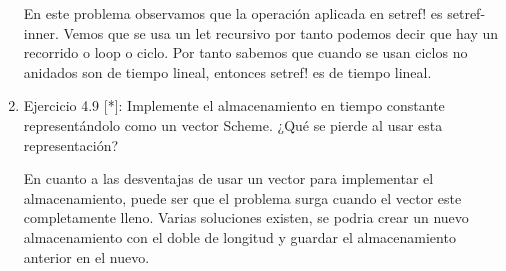 \documentclass[12pt]{exam}
\begin{document}
\begin{enumerate}
\begin{verbatim}
\end{verbatim}
\normalsize

\justifying
En este problema observamos que la operación aplicada en setref! es setref-inner. Vemos que se usa un let recursivo por tanto podemos decir que hay un recorrido o loop o ciclo. Por tanto sabemos que cuando se usan ciclos no anidados son de tiempo lineal, entonces setref! es de tiempo lineal.

\item Ejercicio 4.9 [*]: Implemente el almacenamiento en tiempo constante representándolo como un vector Scheme. ¿Qué se pierde al usar esta representación?

\justifying
En cuanto a las desventajas de usar un vector para implementar el almacenamiento, puede ser que el problema surga cuando el vector este completamente lleno. Varias soluciones existen, se podria crear un nuevo almacenamiento con el doble de longitud y guardar el almacenamiento anterior en el nuevo.

\end{enumerate}
\end{document}
